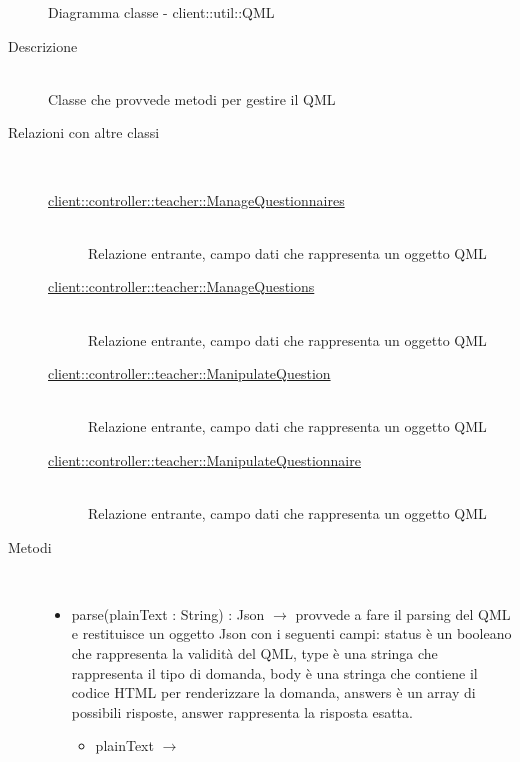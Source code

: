 \begin{figure}[H]
	\centering
	\caption{Diagramma classe - client::util::QML}
\end{figure}\begin{description}
\item[Descrizione] \hfill \\
Classe che provvede metodi per gestire il QML
\item[Relazioni con altre classi] \hfill \\
\vspace{-7mm}
\begin{description}
	\item[\hyperlink{client::controller::teacher::ManageQuestionnaires}{client::controller::teacher::ManageQuestionnaires}] \hfill \\
	Relazione entrante, campo dati che rappresenta un oggetto QML
	\item[\hyperlink{client::controller::teacher::ManageQuestions}{client::controller::teacher::ManageQuestions}] \hfill \\
	Relazione entrante, campo dati che rappresenta un oggetto QML
	\item[\hyperlink{client::controller::teacher::ManipulateQuestion}{client::controller::teacher::ManipulateQuestion}] \hfill \\
	Relazione entrante, campo dati che rappresenta un oggetto QML
	\item[\hyperlink{client::controller::teacher::ManipulateQuestionnaire}{client::controller::teacher::ManipulateQuestionnaire}] \hfill \\
	Relazione entrante, campo dati che rappresenta un oggetto QML
\end{description}

\item[Metodi] \hfill \\
\vspace{-7mm}
\begin{itemize}
	\item parse(plainText : String) : Json $\rightarrow$ provvede a fare il parsing del QML e restituisce un oggetto Json con i seguenti campi: status è un booleano che rappresenta la validità del QML, type è una stringa che rappresenta il tipo di domanda, body è una stringa che contiene il codice HTML per renderizzare la domanda, answers è un array di possibili risposte, answer rappresenta la risposta esatta.\begin{itemize}
		\item plainText $\rightarrow$ 
	\end{itemize}
	

\end{itemize}
\end{description}
